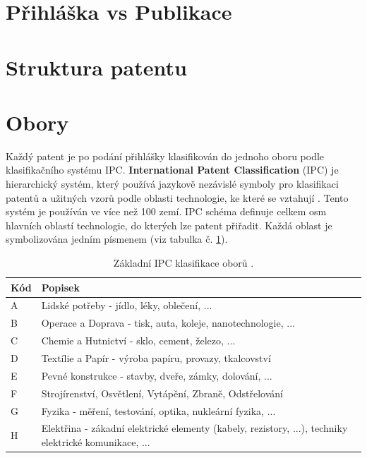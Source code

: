 \section{Přihláška vs Publikace}

\section{Struktura patentu}

\section{Obory}
Každý patent je po podání přihlášky klasifikován do jednoho oboru podle klasifikačního systému \gls{IPC}. \textbf{International Patent Classification} (\gls{IPC}) je hierarchický systém, který používá jazykově nezávislé symboly pro klasifikaci patentů a užitných vzorů podle oblasti technologie, ke které se vztahují \cite{espacenetIPC}. Tento systém je používán ve více než 100 zemí. 
\newline
\indent \gls{IPC} schéma definuje celkem osm hlavních oblastí technologie, do kterých lze patent přiřadit. Každá oblast je symbolizována jedním písmenem (viz tabulka č. \ref{tab:kind_codes}).

	\begin{table}[H]
	\centering
	\begin{tabular}{|>{\centering\arraybackslash}p{1cm}|>{\centering\arraybackslash}p{12cm}|}
	\hline
	\textbf{Kód}    & \textbf{Popisek}\\
	\hline
	A & Lidské potřeby - jídlo, léky, oblečení, ... \\
	\hline
	B & Operace a Doprava - tisk, auta, koleje, nanotechnologie, ...\\
	\hline
	C & Chemie a Hutnictví - sklo, cement, železo, ...\\
	\hline
	D & Textílie a Papír - výroba papíru, provazy, tkalcovství \\
	\hline
	E & Pevné konstrukce -  stavby, dveře, zámky, dolování, ... \\
	\hline
	F & Strojírenství, Osvětlení, Vytápění, Zbraně, Odstřelování \\
	\hline
	G & Fyzika -  měření, testování, optika, nukleární fyzika, ...\\
	\hline
	H & Elektřina - zákadní elektrické elementy (kabely, rezistory, ...), techniky elektrické komunikace, ...  \\
	\hline
	\end{tabular}
	\caption{Základní \gls{IPC} klasifikace oborů \cite{ipc_class}.}
	\label{tab:kind_codes}
	\end{table}


